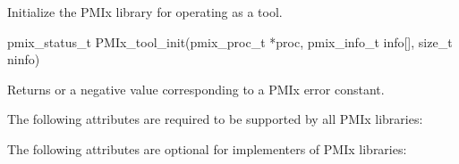 Initialize the \ac{PMIx} library for operating as a tool.

\format

\cspecificstart
\begin{codepar}
pmix_status_t
PMIx_tool_init(pmix_proc_t *proc,
               pmix_info_t info[], size_t ninfo)
\end{codepar}
\cspecificend

\begin{arglist}
\end{arglist}

Returns  or a negative value corresponding to a PMIx error constant.

\reqattrstart
The following attributes are required to be supported by all \ac{PMIx} libraries:


\reqattrend

\optattrstart
The following attributes are optional for implementers of \ac{PMIx} libraries:

